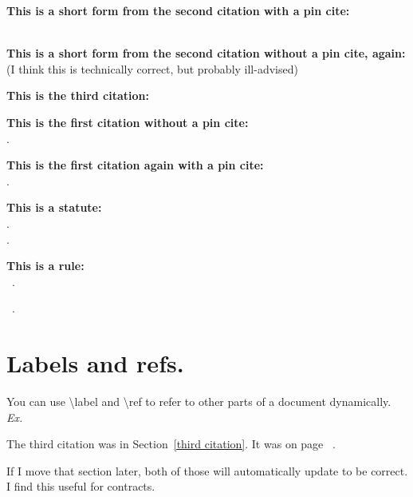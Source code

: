 \documentclass[12pt]{article}
\begin{document}
\textbf{This is a short form from the second citation with a pin cite:}\\
\lipsum[1]~\cite[130]{Gordon2000}

\textbf{This is a short form from the second citation without a pin cite, again:}\\
\cite{Gordon2000} (I think this is technically correct, but probably ill-advised)

\textbf{This is the third citation:}\\
\cite[275]{Kaigler1997}\label{third citation}

\textbf{This is the first citation without a pin cite:}\\
\cite{Northland2020}.

\textbf{This is the first citation again with a pin cite: }\\
\cite[412]{Northland2020}.


\textbf{This is a statute:}\\
\cite{NTV}.\\\cite{NTV}.\\\cite[122]{NTV}

\textbf{This is a rule:}\\
~\cite[4]{TRCP-time}.

~\cite[4]{TRCP}.

\clearpage

\section{Labels and refs.}
You can use \textbackslash{}label and \textbackslash{}ref to refer to other parts of a document dynamically. \emph{Ex.}

The third citation was in Section~\ref{third citation}. It was on page ~\pageref{third citation}.

If I move that section later, both of those will automatically update to be correct. I find this useful for contracts.
\end{document}
